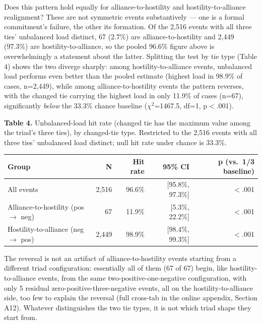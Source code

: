 \documentclass[Afour,sageh,times,doublespace]{sagej}
\begin{document}
Does this pattern hold equally for alliance-to-hostility and hostility-to-alliance realignment? These are not symmetric events substantively --- one is a formal commitment's failure, the other its formation. Of the 2,516 events with all three ties' unbalanced load distinct, 67 (2.7\%) are alliance-to-hostility and 2,449 (97.3\%) are hostility-to-alliance, so the pooled 96.6\% figure above is overwhelmingly a statement about the latter. Splitting the test by tie type (Table 4) shows the two diverge sharply: among hostility-to-alliance events, unbalanced load performs even better than the pooled estimate (highest load in 98.9\% of cases, n=2,449), while among alliance-to-hostility events the pattern reverses, with the changed tie carrying the highest load in only 11.9\% of cases (n=67), significantly \emph{below} the 33.3\% chance baseline ($\chi^2$=1467.5, df=1, p$<$.001).

\begin{table}[t]
\centering
\textbf{Table 4.} Unbalanced-load hit rate (changed tie has the maximum value among the triad's three ties), by changed-tie type. Restricted to the 2,516 events with all three ties' unbalanced load distinct; null hit rate under chance is 33.3\%.

\vspace{4pt}
{\small\sf
\begin{tabular}{lrrrr}
\toprule
Group & N & Hit rate & 95\% CI & p (vs.~1/3 baseline)\\
\midrule
All events & 2,516 & 96.6\% & [95.8\%, 97.3\%] & $<$.001\\
Alliance-to-hostility (pos $\rightarrow$ neg) & 67 & 11.9\% & [5.3\%, 22.2\%] & $<$.001\\
Hostility-to-alliance (neg $\rightarrow$ pos) & 2,449 & 98.9\% & [98.4\%, 99.3\%] & $<$.001\\
\bottomrule
\end{tabular}
\par}
\end{table}

The reversal is not an artifact of alliance-to-hostility events starting from a different triad configuration: essentially all of them (67 of 67) begin, like hostility-to-alliance events, from the same two-positive-one-negative configuration, with only 5 residual zero-positive-three-negative events, all on the hostility-to-alliance side, too few to explain the reversal (full cross-tab in the online appendix, Section A12). Whatever distinguishes the two tie types, it is not which triad shape they start from.
\end{document}
